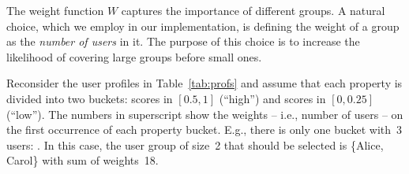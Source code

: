 The weight function $W$ captures the importance of different groups. A natural choice, which we employ in our implementation, is defining the weight of a group as the \emph{number of users} in it. The purpose of this choice is to increase the likelihood of covering large groups before small ones.   



\begin{example}
	Reconsider the user profiles in Table~\ref{tab:profs} and assume that each property is divided into two buckets: scores in $[0.5,1]$ (``high'') and scores in $[0,0.25]$ (``low''). The numbers in superscript show the weights -- i.e., number of users -- on the first occurrence of each property bucket. E.g., there is only one bucket with~3 users: . %
	In this case, the user group of size~2 that should be selected is \{Alice, Carol\} with sum of weights~18. %
\end{example}







